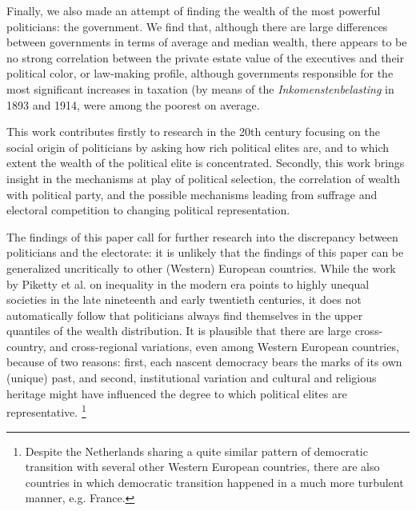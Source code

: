     Finally, we also made an attempt of finding the wealth of the most powerful politicians: the government. We find that, although there are large differences between governments in terms of average and median wealth, there appears to be no strong correlation between the private estate value of the executives and their political color, or law-making profile, although governments responsible for the most significant increases in taxation (by means of the \textit{Inkomenstenbelasting} in 1893 and 1914, were among the poorest on average.

    This work contributes firstly to research in the 20th century focusing on the social origin of politicians by asking how rich political elites are, and to which extent the wealth of the political elite is concentrated. \autocite{van1983toegang, secker1989social, secker1991ministers, van1999eerste, moes2012onder} Secondly, this work brings insight in the mechanisms at play of political selection, the correlation of wealth with political party, and the possible mechanisms leading from suffrage and electoral competition to changing political representation.  \autocite{besley2005political, dal2018progress}

    The findings of this paper call for further research into the discrepancy between politicians and the electorate: it is unlikely that the findings of this paper can be generalized uncritically to other (Western) European countries. While the work by Piketty et al. on inequality in the modern era points to highly unequal societies in the late nineteenth and early twentieth centuries, it does not automatically follow that politicians always find themselves in the upper quantiles of the wealth distribution. \autocite{piketty2003income, piketty2014inequality} It is plausible that there are large cross-country, and cross-regional variations, even among Western European countries, because of two reasons: first, each nascent democracy bears the marks of its own (unique) past, and second, institutional variation and cultural and religious heritage might have influenced the degree to which political elites are representative. \autocite{acemoglu2011consequences} \footnote{Despite the Netherlands sharing a quite similar pattern of democratic transition with several other Western European countries, there are also countries in which democratic transition happened in a much more turbulent manner, e.g. France. }

